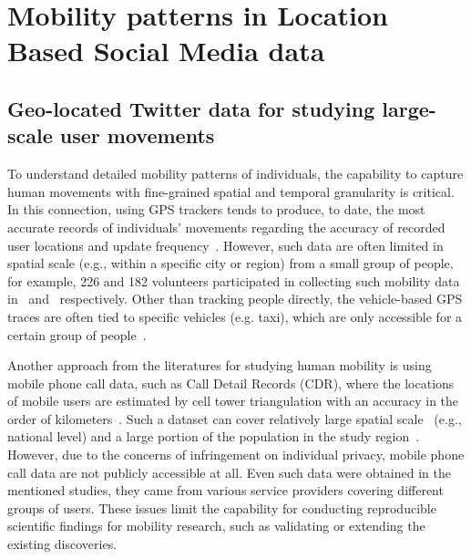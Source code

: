 \documentclass[ijgi,article,accept,moreauthors,pdftex,10pt,a4paper]{mdpi}
\theoremstyle{mdpi}
\newcounter{ex}
\newcounter{re}
\theoremstyle{mdpidefinition}
\begin{document}
\section{Mobility patterns in Location Based Social Media data}
\subsection{Geo-located Twitter data for studying large-scale user movements}
To understand detailed mobility patterns of individuals, the capability to capture human movements with fine-grained spatial and temporal granularity is critical.
In this connection, using GPS trackers tends to produce, to date, the most accurate records of individuals' movements regarding the accuracy of recorded user locations and update frequency~\cite{zheng2008understanding}.
However, such data are often limited in spatial scale (e.g., within a specific city or region) from a small group of people, for example, 226 and 182 volunteers participated in collecting such mobility data in~\cite{rhee2011levy} and~\cite{zheng2010geolife} respectively.
Other than tracking people directly, the vehicle-based GPS traces are often tied to specific vehicles (e.g. taxi), which are only accessible for a certain group of people~\cite{kung2014exploring}. 

Another approach from the literatures for studying human mobility is using mobile phone call data, such as Call Detail Records (CDR), where the locations of mobile users are estimated by cell tower triangulation with an accuracy in the order of kilometers~\cite{gonzalez2008understanding,sevtsuk2010does,kung2014exploring}.
Such a dataset can cover relatively large spatial scale~\cite{becker2013human,sobolevsky2013delineating} (e.g., national level) and a large portion of the population in the study region~\cite{kung2014exploring}.
However, due to the concerns of infringement on individual privacy, mobile phone call data are not publicly accessible at all.
Even such data were obtained in the mentioned studies, they came from various service providers covering different groups of users.
These issues limit the capability for conducting reproducible scientific findings for mobility research, such as validating or extending the existing discoveries.
\end{document}
